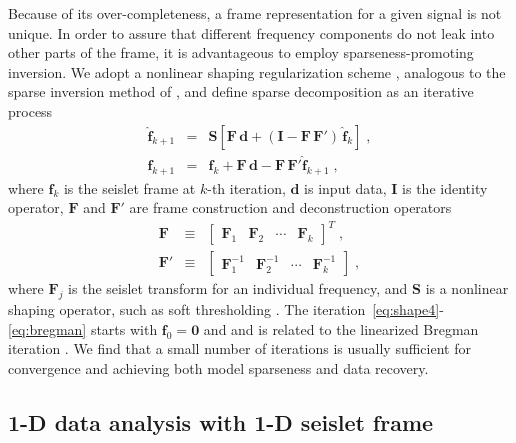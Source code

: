 Because of its over-completeness, a frame representation for a given
signal is not unique. In order to assure that different frequency
components do not leak into other parts of the frame, it is
advantageous to employ sparseness-promoting inversion. We adopt a
nonlinear shaping regularization scheme \cite[]{inv}, analogous to the
sparse inversion method of \cite{daube}, and define sparse
decomposition as  an iterative process 
\begin{eqnarray}
  \label{eq:shape4}
  \widehat{\mathbf{f}}_{k+1} & = & \mathbf{S}[\mathbf{F}\,\mathbf{d}+(\mathbf{I}-\mathbf{F}\,
   \mathbf{F}')\,\widehat{\mathbf{f}}_{k}]\;, \\
   \mathbf{f}_{k+1} & = & \mathbf{f}_k + \mathbf{F}\,\mathbf{d}- \mathbf{F}\,\mathbf{F}' \widehat{\mathbf{f}}_{k+1}\;,
   \label{eq:bregman} 
\end{eqnarray}
where $\mathbf{f}_k$ is the seislet frame at $k$-th iteration,
$\mathbf{d}$ is input data, 
$\mathbf{I}$ is the identity operator,
$\mathbf{F}$ and $\mathbf{F}'$ are frame construction and deconstruction 
operators 
\begin{eqnarray*}
  \mathbf{F} & \equiv & 
\left[\begin{array}{cccc}\mathbf{F}_1 &\mathbf{F}_2 & 
    \cdots &\mathbf{F}_k\end{array}\right]^T\;, \\
\mathbf{F}' & \equiv &  
\left[\begin{array}{cccc}\mathbf{F}_1^{-1} &\mathbf{F}_2^{-1} & 
    \cdots &\mathbf{F}_k^{-1}\end{array}\right]\;,
\end{eqnarray*}
where $\mathbf{F}_j$ is the seislet transform for an individual frequency, and 
$\mathbf{S}$ is a nonlinear shaping operator, such as soft thresholding 
\cite[]{donoho}. The iteration~\ref{eq:shape4}-\ref{eq:bregman} starts 
with $\mathbf{f}_0=\mathbf{0}$ and 
 and is related
to the linearized Bregman iteration \cite[]{Osher05,Yin08}.  We find
that a small number of iterations is usually sufficient for
convergence and achieving both model sparseness and data recovery.

\subsection{1-D data analysis with 1-D seislet frame}


